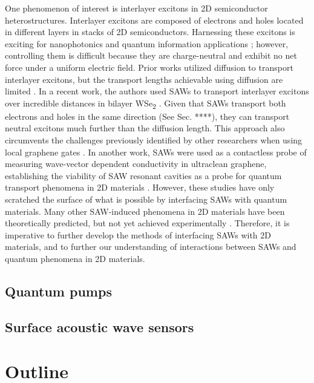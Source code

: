 \documentclass[double,12pt,1in]{beavtex}
\begin{document}
One phenomenon of interest is interlayer excitons in 2D semiconductor heterostructures. Interlayer excitons are composed of electrons and holes located in different layers in stacks of 2D semiconductors. Harnessing these excitons is exciting for nanophotonics and quantum information applications \cite{tran_evidence_2019}; however, controlling them is difficult because they are charge-neutral and exhibit no net force under a uniform electric field. Prior works utilized diffusion to transport interlayer excitons, but the transport lengths achievable using diffusion are limited \cite{jauregui_electrical_2019,unuchek_room-temperature_2018}. In a recent work, the authors used SAWs to transport interlayer excitons over incredible distances in bilayer WSe\textsubscript{2} \cite{peng_long-range_2022}. Given that SAWs transport both electrons and holes in the same direction (See Sec. ****), they can transport neutral excitons much further than the diffusion length. This approach also circumvents the challenges previously identified by other researchers when using local graphene gates \cite{liu_electrically_2020}. In another work, SAWs were used as a contactless probe of measuring wave-vector dependent conductivity in ultraclean graphene, establishing the viability of SAW resonant cavities as a probe for quantum transport phenomena in 2D materials \cite{fang_quantum_2023}. However, these studies have only scratched the surface of what is possible by interfacing SAWs with quantum materials. Many other SAW-induced phenomena in 2D materials have been theoretically predicted, but not yet achieved experimentally \cite{nie_surface_2023}. Therefore, it is imperative to further develop the methods of interfacing SAWs with 2D materials, and to further our understanding of interactions between SAWs and quantum phenomena in 2D materials.

\subsection{Quantum pumps}


\subsection{Surface acoustic wave sensors}







\section{Outline}
\end{document}
